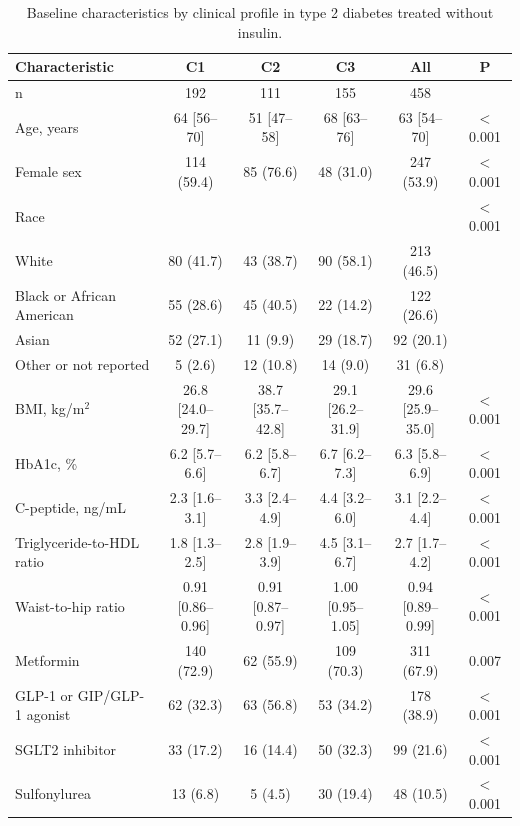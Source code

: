 \begin{table}[htbp]
\centering
\footnotesize
\caption{Baseline characteristics by clinical profile in type 2 diabetes treated without insulin.}
\label{tab:baseline}
\begin{tabular}{lccccc}
\toprule
Characteristic & C1 & C2 & C3 & All & P \\
\midrule
n & 192 & 111 & 155 & 458 &  \\
Age, years & 64 [56--70] & 51 [47--58] & 68 [63--76] & 63 [54--70] & $<$0.001 \\
Female sex & 114 (59.4) & 85 (76.6) & 48 (31.0) & 247 (53.9) & $<$0.001 \\
Race &  &  &  &  & $<$0.001 \\
\hspace{1em}White & 80 (41.7) & 43 (38.7) & 90 (58.1) & 213 (46.5) &  \\
\hspace{1em}Black or African American & 55 (28.6) & 45 (40.5) & 22 (14.2) & 122 (26.6) &  \\
\hspace{1em}Asian & 52 (27.1) & 11 (9.9) & 29 (18.7) & 92 (20.1) &  \\
\hspace{1em}Other or not reported & 5 (2.6) & 12 (10.8) & 14 (9.0) & 31 (6.8) &  \\
BMI, kg/m$^2$ & 26.8 [24.0--29.7] & 38.7 [35.7--42.8] & 29.1 [26.2--31.9] & 29.6 [25.9--35.0] & $<$0.001 \\
HbA1c, \% & 6.2 [5.7--6.6] & 6.2 [5.8--6.7] & 6.7 [6.2--7.3] & 6.3 [5.8--6.9] & $<$0.001 \\
C-peptide, ng/mL & 2.3 [1.6--3.1] & 3.3 [2.4--4.9] & 4.4 [3.2--6.0] & 3.1 [2.2--4.4] & $<$0.001 \\
Triglyceride-to-HDL ratio & 1.8 [1.3--2.5] & 2.8 [1.9--3.9] & 4.5 [3.1--6.7] & 2.7 [1.7--4.2] & $<$0.001 \\
Waist-to-hip ratio & 0.91 [0.86--0.96] & 0.91 [0.87--0.97] & 1.00 [0.95--1.05] & 0.94 [0.89--0.99] & $<$0.001 \\
Metformin & 140 (72.9) & 62 (55.9) & 109 (70.3) & 311 (67.9) & 0.007 \\
GLP-1 or GIP/GLP-1 agonist & 62 (32.3) & 63 (56.8) & 53 (34.2) & 178 (38.9) & $<$0.001 \\
SGLT2 inhibitor & 33 (17.2) & 16 (14.4) & 50 (32.3) & 99 (21.6) & $<$0.001 \\
Sulfonylurea & 13 (6.8) & 5 (4.5) & 30 (19.4) & 48 (10.5) & $<$0.001 \\
\bottomrule
\end{tabular}

\end{table}

